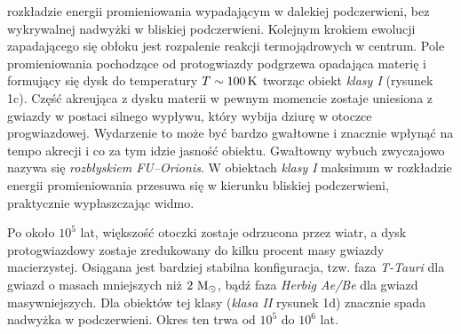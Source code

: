 rozkładzie energii promieniowania wypadającym w dalekiej podczerwieni, bez
wykrywalnej nadwyżki w bliskiej podczerwieni.
Kolejnym krokiem ewolucji zapadającego się obłoku jest rozpalenie reakcji
termojądrowych w centrum. Pole promieniowania pochodzące od protogwiazdy
podgrzewa opadająca materię i formujący się dysk do temperatury $T \sim
100\hbox{$\thinspace\textrm{K}$}$ tworząc obiekt \emph{klasy I} (rysunek 1c).  Część
akreująca z dysku materii w pewnym momencie zostaje uniesiona z gwiazdy w
postaci silnego wypływu, który wybija dziurę w otoczce progwiazdowej. Wydarzenie
to może być bardzo gwałtowne i znacznie wpłynąć na tempo akrecji i co za tym
idzie jasność obiektu. Gwałtowny wybuch zwyczajowo nazywa się \emph{rozbłyskiem
FU--Orionis}.
W obiektach \emph{klasy I} maksimum w rozkładzie energii promieniowania przesuwa
się w kierunku bliskiej podczerwieni, praktycznie wypłaszczając widmo.  \par Po
około $10^5$ lat, większość otoczki zostaje odrzucona przez wiatr, a dysk
protogwiazdowy zostaje zredukowany do kilku procent masy gwiazdy macierzystej.
Osiągana jest bardziej stabilna konfiguracja, tzw. faza \emph{T-Tauri} dla
gwiazd o masach mniejszych niż $2\thinspace\hbox{$\mathrm{\thinspace M_{\odot}}$}$, bądź faza \emph{Herbig Ae/Be}
dla gwiazd masywniejszych. Dla obiektów tej klasy (\emph{klasa II} rysunek 1d)
znacznie spada nadwyżka w podczerwieni. Okres ten trwa od $10^5$ do $10^6$ lat.



